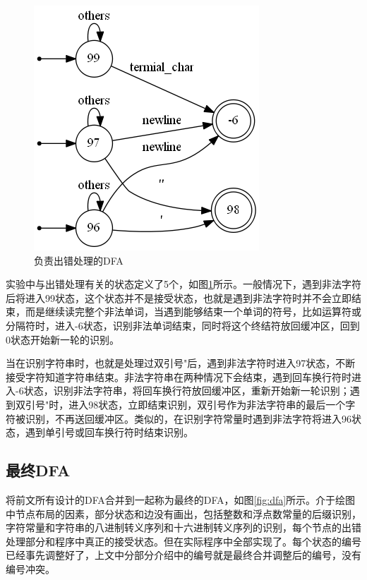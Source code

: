 \documentclass[UTF8, twoside, titlepage]{ctexart}
\begin{document}
\begin{figure}[htbp]
	\centering
	\includegraphics[scale=0.54]{images/error.png}
	\caption{负责出错处理的DFA}
	\label{fig:error}
\end{figure}

实验中与出错处理有关的状态定义了5个，如图\ref{fig:error}所示。一般情况下，遇到非法字符后将进入99状态，这个状态并不是接受状态，也就是遇到非法字符时并不会立即结束，而是继续读完整个非法单词，当遇到能够结束一个单词的符号，比如运算符或分隔符时，进入-6状态，识别非法单词结束，同时将这个终结符放回缓冲区，回到0状态开始新一轮的识别。

当在识别字符串时，也就是处理过双引号"后，遇到非法字符时进入97状态，不断接受字符知道字符串结束。非法字符串在两种情况下会结束，遇到回车换行符时进入-6状态，识别非法字符串，将回车换行符放回缓冲区，重新开始新一轮识别；遇到双引号"时，进入98状态，立即结束识别，双引号作为非法字符串的最后一个字符被识别，不再送回缓冲区。类似的，在识别字符常量时遇到非法字符将进入96状态，遇到单引号或回车换行符时结束识别。

\subsection{最终DFA}
将前文所有设计的DFA合并到一起称为最终的DFA，如图\ref{fig:dfa}所示。介于绘图中节点布局的因素，部分状态和边没有画出，包括整数和浮点数常量的后缀识别，字符常量和字符串的八进制转义序列和十六进制转义序列的识别，每个节点的出错处理部分和程序中真正的接受状态。但在实际程序中全部实现了。每个状态的编号已经事先调整好了，上文中分部分介绍中的编号就是最终合并调整后的编号，没有编号冲突。
\end{document}
